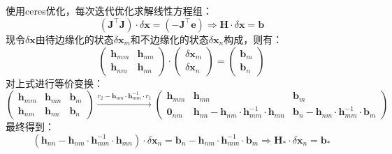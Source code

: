 \documentclass[12pt, onecolumn]{article}
\newcommand\normf{\fangsong}
\begin{document}
	\subsection{\normf{舒尔补}}
	使用ceres优化，每次迭代优化求解线性方程组：
	\begin{equation}
	\left( \boldsymbol{J}^\top\boldsymbol{J}\right) \cdot\delta\boldsymbol{x}=
	\left( -\boldsymbol{J}^\top\boldsymbol{e}\right) 
	\Rightarrow
	\boldsymbol{H}\cdot\delta\boldsymbol{x}=\boldsymbol{b}
	\end{equation}
	现令$\delta\boldsymbol{x}$由待边缘化的状态$\delta\boldsymbol{x}_m$和不边缘化的状态$\delta\boldsymbol{x}_n$构成，则有：
	\begin{equation}
	\begin{pmatrix}
	\boldsymbol{h}_{mm}&\boldsymbol{h}_{mn}\\
	\boldsymbol{h}_{nm}&\boldsymbol{h}_{nn}
	\end{pmatrix}\cdot\begin{pmatrix}
	\delta\boldsymbol{x}_m\\
	\delta\boldsymbol{x}_n
	\end{pmatrix}=\begin{pmatrix}
	\boldsymbol{b}_{m}\\\boldsymbol{b}_{n}
	\end{pmatrix}
	\end{equation}
	对上式进行等价变换：
	\begin{equation}
	\left( \begin{array}{cc|c}
	\boldsymbol{h}_{mm}&\boldsymbol{h}_{mn}&\boldsymbol{b}_m\\
	\boldsymbol{h}_{nm}&\boldsymbol{h}_{nn}&\boldsymbol{b}_n
	\end{array}\right) 
	\xrightarrow{r_2-\boldsymbol{h}_{nm}\cdot\boldsymbol{h}_{mm}^{-1}\cdot r_1}
	\left( \begin{array}{cc|cc}
	\boldsymbol{h}_{mm}&\boldsymbol{h}_{mn}&\boldsymbol{b}_m\\
	\boldsymbol{0}_{nm}&\boldsymbol{h}_{nn}-\boldsymbol{h}_{nm}\cdot\boldsymbol{h}_{mm}^{-1}\cdot\boldsymbol{h}_{mn}
	&
	\boldsymbol{b}_n-\boldsymbol{h}_{nm}\cdot\boldsymbol{h}_{mm}^{-1}\cdot\boldsymbol{b}_{m}
	\end{array}\right) 
	\end{equation}
	最终得到：
	\begin{equation}
	\left(
	\boldsymbol{h}_{nn}-\boldsymbol{h}_{nm}\cdot\boldsymbol{h}_{mm}^{-1}\cdot\boldsymbol{h}_{mn}\right) \cdot\delta\boldsymbol{x}_n=	\boldsymbol{b}_n-\boldsymbol{h}_{nm}\cdot\boldsymbol{h}_{mm}^{-1}\cdot\boldsymbol{b}_{m}
	\Rightarrow
	\boldsymbol{H}_*\cdot\delta\boldsymbol{x}_n=\boldsymbol{b}_*
	\end{equation}
\end{document}
